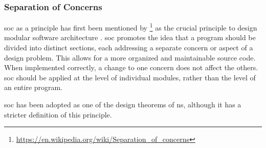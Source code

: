 \subsubsection{Separation of Concerns} \label{subsubsec:soc}

\gls{soc} as a principle has first been mentioned by
\citeauthor{dijkstra_selected_1982}\footnote{\url{https://en.wikipedia.org/wiki/Separation_of_concerns}}
as the crucial principle to design modular software architecture
\parencite[]{dijkstra_selected_1982}. \gls{soc} promotes the idea that a program should be
divided into distinct sections, each addressing a separate concern or aspect of a design
problem. This allows for a more organized and maintainable source code. When implemented
correctly, a change to one concern does not affect the others. \gls{soc} should be applied
at the level of individual modules, rather than the level of an entire program.

\gls{soc} has been adopted as one of the design theorems of \gls{ns}, although it has a
stricter definition of this principle\parencite{mannaert_normalized_2016}.

